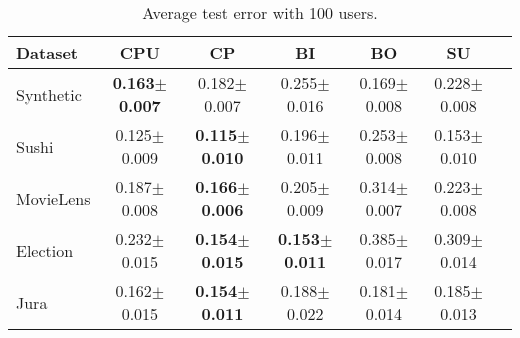 \newcommand{\ic}{\hspace{0.25cm}}
\begin{table}
\centering
\caption{Average test error with 100 users.}
\begin{tabular}{@{\ic}l@{\ic}c@{\ic}c@{\ic}c@{\ic}c@{\ic}c@{\ic}c@{\ic}}
\hline
\textbf{Dataset} &\textbf{CPU}&\textbf{CP}&\textbf{BI}&\textbf{BO}&\textbf{SU}\\
\hline
Synthetic&\bf{0.163$\pm$0.007}&0.182$\pm$0.007&0.255$\pm$0.016&0.169$\pm$0.008&0.228$\pm$0.008\\
Sushi&0.125$\pm$0.009&\bf{0.115$\pm$0.010}&0.196$\pm$0.011&0.253$\pm$0.008&0.153$\pm$0.010\\
MovieLens&0.187$\pm$0.008&\bf{0.166$\pm$0.006}&0.205$\pm$0.009&0.314$\pm$0.007&0.223$\pm$0.008\\
Election&0.232$\pm$0.015&\bf{0.154$\pm$0.015}&\bf{0.153$\pm$0.011}&0.385$\pm$0.017&0.309$\pm$0.014\\
Jura&0.162$\pm$0.015&\bf{0.154$\pm$0.011}&0.188$\pm$0.022&0.181$\pm$0.014&0.185$\pm$0.013\\
\hline
\end{tabular} \label{tab:errorSmallDatasets}
\label{tab:small}
\end{table}
